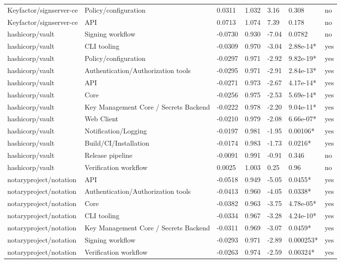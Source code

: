 \begin{table}[t]
\begin{tabular}{lllllll}
Keyfactor/signserver-ce & Policy/configuration & 0.0311 & 1.032 & 3.16 & 0.308 & no \\
Keyfactor/signserver-ce & API & 0.0713 & 1.074 & 7.39 & 0.178 & no \\
hashicorp/vault & Signing workflow & -0.0730 & 0.930 & -7.04 & 0.0782 & no \\
hashicorp/vault & CLI tooling & -0.0309 & 0.970 & -3.04 & 2.88e-14* & yes \\
hashicorp/vault & Policy/configuration & -0.0297 & 0.971 & -2.92 & 9.82e-19* & yes \\
hashicorp/vault & Authentication/Authorization tools & -0.0295 & 0.971 & -2.91 & 2.84e-13* & yes \\
hashicorp/vault & API & -0.0271 & 0.973 & -2.67 & 4.17e-14* & yes \\
hashicorp/vault & Core & -0.0256 & 0.975 & -2.53 & 5.69e-14* & yes \\
hashicorp/vault & Key Management Core / Secrets Backend & -0.0222 & 0.978 & -2.20 & 9.04e-11* & yes \\
hashicorp/vault & Web Client & -0.0210 & 0.979 & -2.08 & 6.66e-07* & yes \\
hashicorp/vault & Notification/Logging & -0.0197 & 0.981 & -1.95 & 0.00106* & yes \\
hashicorp/vault & Build/CI/Installation & -0.0174 & 0.983 & -1.73 & 0.0216* & yes \\
hashicorp/vault & Release pipeline & -0.0091 & 0.991 & -0.91 & 0.346 & no \\
hashicorp/vault & Verification workflow & 0.0025 & 1.003 & 0.25 & 0.96 & no \\
notaryproject/notation & API & -0.0518 & 0.949 & -5.05 & 0.0455* & yes \\
notaryproject/notation & Authentication/Authorization tools & -0.0413 & 0.960 & -4.05 & 0.0338* & yes \\
notaryproject/notation & Core & -0.0382 & 0.963 & -3.75 & 4.78e-05* & yes \\
notaryproject/notation & CLI tooling & -0.0334 & 0.967 & -3.28 & 4.24e-10* & yes \\
notaryproject/notation & Key Management Core / Secrets Backend & -0.0311 & 0.969 & -3.07 & 0.0459* & yes \\
notaryproject/notation & Signing workflow & -0.0293 & 0.971 & -2.89 & 0.000253* & yes \\
notaryproject/notation & Verification workflow & -0.0263 & 0.974 & -2.59 & 0.00324* & yes \\

\end{tabular}
\end{table}
